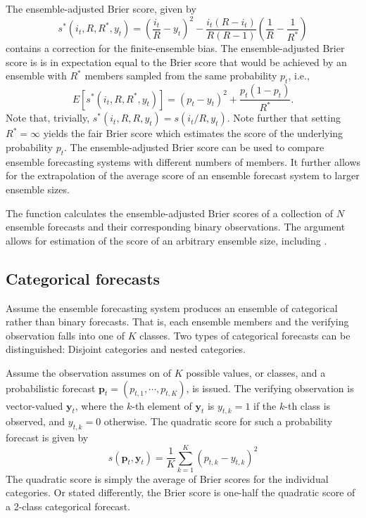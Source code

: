 \documentclass[article]{jss}
\begin{document}
The ensemble-adjusted Brier score, given by \citep{ferro2008effect}
%
\begin{equation}
s^*(i_t, R, R^*, y_t) = \left(\frac{i_t}{R} - y_t\right)^2 - \frac{i_t(R-i_t)}{R(R-1)}\left(\frac{1}{R} - \frac{1}{R^*}\right)
\label{eq:ens-brier}
\end{equation}
%
contains a correction for the finite-ensemble bias.
The ensemble-adjusted Brier score is is in expectation equal to the Brier score that would be achieved by an ensemble with $R^*$ members sampled from the same probability $p_t$, i.e., 
%
\begin{equation}
E\left[s^*(i_t, R, R^*, y_t)\right] = (p_t - y_t)^2 + \frac{p_t(1-p_t)}{R^*}.
\end{equation}
%
Note that, trivially, $s^*(i_t, R, R, y_t) = s(i_t/R, y_t)$.
Note further that setting $R^*=\infty$ yields the fair Brier score \citep{ferro2013fair} which estimates the score of the underlying probability $p_t$.
The ensemble-adjusted Brier score can be used to compare ensemble forecasting systems with different numbers of members.
It further allows for the extrapolation of the average score of an ensemble forecast system to larger ensemble sizes.


The  function  calculates the ensemble-adjusted Brier scores of a collection of $N$ ensemble forecasts and their corresponding binary observations. 
The argument  allows for estimation of the score of an arbitrary ensemble size, including .


\subsection{Categorical forecasts}


Assume the ensemble forecasting system produces an ensemble of categorical rather than binary forecasts.
That is, each ensemble members and the verifying observation falls into one of $K$ classes.
Two types of categorical forecasts can be distinguished: Disjoint categories and nested categories.

Assume the observation assumes on of $K$ possible values, or classes, and a probabilistic forecast $\mathbf{p}_t = (p_{t,1}, \cdots, p_{t,K})$, is issued.
The verifying observation is vector-valued $\mathbf{y}_t$, where the $k$-th element of $\mathbf{y}_t$ is $y_{t,k}=1$ if the $k$-th class is observed, and $y_{t,k}=0$ otherwise.
The quadratic score for such a probability forecast is given by
%
\begin{equation}
s(\mathbf{p}_t, \mathbf{y}_t) = \frac{1}{K}\sum_{k=1}^K \left(p_{t,k} - y_{t,k}\right)^2
\end{equation}
%
The quadratic score is simply the average of Brier scores for the individual categories.
Or stated differently, the Brier score is one-half the quadratic score of a 2-class categorical forecast.
\end{document}
